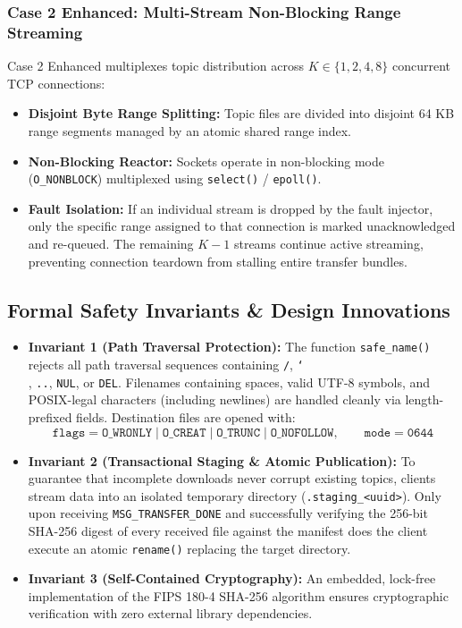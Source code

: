 \documentclass[11pt,a4paper]{article}
\begin{document}
\subsubsection{Case 2 Enhanced: Multi-Stream Non-Blocking Range Streaming}
Case 2 Enhanced multiplexes topic distribution across $K \in \{1, 2, 4, 8\}$ concurrent TCP connections:
\begin{itemize}
    \item \textbf{Disjoint Byte Range Splitting:} Topic files are divided into disjoint 64 KB range segments managed by an atomic shared range index.
    \item \textbf{Non-Blocking Reactor:} Sockets operate in non-blocking mode (\texttt{O\_NONBLOCK}) multiplexed using \texttt{select()} / \texttt{epoll()}.
    \item \textbf{Fault Isolation:} If an individual stream is dropped by the fault injector, only the specific range assigned to that connection is marked unacknowledged and re-queued. The remaining $K-1$ streams continue active streaming, preventing connection teardown from stalling entire transfer bundles.
\end{itemize}

\subsection{Formal Safety Invariants \& Design Innovations}
\begin{itemize}
    \item \textbf{Invariant 1 (Path Traversal Protection):} The function \texttt{safe\_name()} rejects all path traversal sequences containing \texttt{/}, \texttt{\char`\\}, \texttt{..}, \texttt{NUL}, or \texttt{DEL}. Filenames containing spaces, valid UTF-8 symbols, and POSIX-legal characters (including newlines) are handled cleanly via length-prefixed fields. Destination files are opened with:
    \[ \texttt{flags} = \texttt{O\_WRONLY} \mid \texttt{O\_CREAT} \mid \texttt{O\_TRUNC} \mid \texttt{O\_NOFOLLOW}, \qquad \texttt{mode} = \texttt{0644} \]
    \item \textbf{Invariant 2 (Transactional Staging \& Atomic Publication):} To guarantee that incomplete downloads never corrupt existing topics, clients stream data into an isolated temporary directory (\texttt{.staging\_<uuid>}). Only upon receiving \texttt{MSG\_TRANSFER\_DONE} and successfully verifying the 256-bit SHA-256 digest of every received file against the manifest does the client execute an atomic \texttt{rename()} replacing the target directory.
    \item \textbf{Invariant 3 (Self-Contained Cryptography):} An embedded, lock-free implementation of the FIPS 180-4 SHA-256 algorithm ensures cryptographic verification with zero external library dependencies.
\end{itemize}
\end{document}
